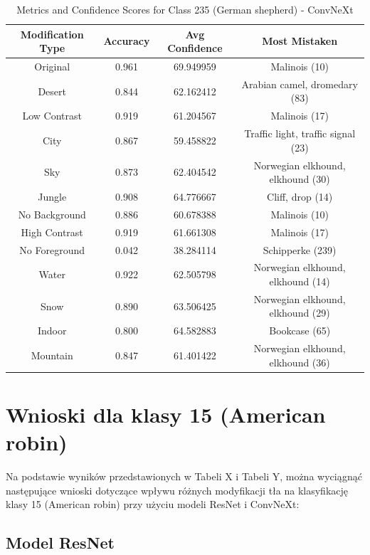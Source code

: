 \begin{table}
	\centering
	\begin{tabular}{|c|c|c|c|}
		\hline
		\textbf{Modification Type} & \textbf{Accuracy} & \textbf{Avg Confidence} & \textbf{Most Mistaken} \\
		\hline
		Original & 0.961 & 69.949959 & Malinois (10) \\
		\hline
		Desert & 0.844 & 62.162412 & Arabian camel, dromedary (83) \\
		\hline
		Low Contrast & 0.919 & 61.204567 & Malinois (17) \\
		\hline
		City & 0.867 & 59.458822 & Traffic light, traffic signal (23) \\
		\hline
		Sky & 0.873 & 62.404542 & Norwegian elkhound, elkhound (30) \\
		\hline
		Jungle & 0.908 & 64.776667 & Cliff, drop (14) \\
		\hline
		No Background & 0.886 & 60.678388 & Malinois (10) \\
		\hline
		High Contrast & 0.919 & 61.661308 & Malinois (17) \\
		\hline
		No Foreground & 0.042 & 38.284114 & Schipperke (239) \\
		\hline
		Water & 0.922 & 62.505798 & Norwegian elkhound, elkhound (14) \\
		\hline
		Snow & 0.890 & 63.506425 & Norwegian elkhound, elkhound (29) \\
		\hline
		Indoor & 0.800 & 64.582883 & Bookcase (65) \\
		\hline
		Mountain & 0.847 & 61.401422 & Norwegian elkhound, elkhound (36) \\
		\hline
	\end{tabular}
	\caption{Metrics and Confidence Scores for Class 235 (German shepherd) - ConvNeXt}
	\label{tab:metrics_confidence_class_235_convnext}
\end{table}

\section*{Wnioski dla klasy 15 (American robin)}

Na podstawie wyników przedstawionych w Tabeli X i Tabeli Y, można wyciągnąć następujące wnioski dotyczące wpływu różnych modyfikacji tła na klasyfikację klasy 15 (American robin) przy użyciu modeli ResNet i ConvNeXt:

\subsection*{Model ResNet}


